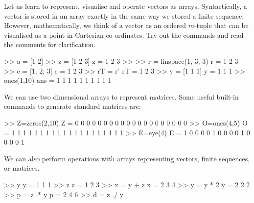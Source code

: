 \begin{labwork}\label{LW:VecsMats}
Let us learn to represent, visualise and operate vectors as \Matlab arrays.  Syntactically, a vector is stored in an array exactly in the same way we stored a finite sequence.  However, mathematically, we think of a vector as an ordered $m$-tuple that can be visualised as a point in Cartesian co-ordinates.  Try out the commands and read the comments for clarification.
\begin{VrbM}
>> a = [1 2]	%
>> z = [1 2 3] 	%
z =     1     2     3
>> %
>> r = linspace(1, 3, 3)		%
r =     1     2     3
>> c = [1; 2; 3]  	%
c =
     1
     2
     3
>> rT = r'	%
rT =
     1
     2
     3
>> y = [1 1 1] 			%
y =     1     1     1
>> ones(1,10)	%
ans =     1     1     1     1     1     1     1     1     1     1
\end{VrbM}
We can use two dimensional arrays to represent matrices.  Some useful built-in commands to generate standard matrices are:
\begin{VrbM}
>> Z=zeros(2,10) %
Z =
     0     0     0     0     0     0     0     0     0     0
     0     0     0     0     0     0     0     0     0     0
>> O=ones(4,5) %
O =
     1     1     1     1     1
     1     1     1     1     1
     1     1     1     1     1
     1     1     1     1     1
>> E=eye(4) %
E =
     1     0     0     0
     0     1     0     0
     0     0     1     0
     0     0     0     1
\end{VrbM}
We can also perform operations with arrays representing vectors, finite sequences, or matrices.
\begin{VrbM}
>> y %
y =     1     1     1
>> z %
z =     1     2     3
>> x = y + z   			%
x =     2     3     4
>> y = y * 2    			%
y =     2     2     2
>> p = z .* y   			%
p =     2     4     6
>> d = z ./ y    			%

\end{VrbM}
\end{labwork}
